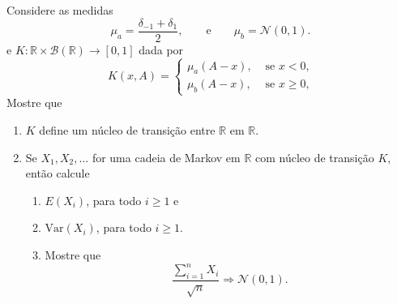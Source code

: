 \begin{exercise}
  Considere as medidas
  \begin{equation}
    \mu_a = \frac{\delta_{-1} + \delta_1}{2}, \qquad \text{e} \qquad \mu_b = \mathcal{N}(0, 1).
  \end{equation}
  e $K:\mathbb{R} \times \mathcal{B}(\mathbb{R}) \to [0,1]$ dada por
  \begin{equation}
    K(x, A) =
    \begin{cases}
      \mu_a (A - x), & \text{ se $x < 0$,}\\
      \mu_b (A - x), & \text{ se $x \geq 0$,}
    \end{cases}
  \end{equation}
  Mostre que
  \begin{enumerate}[\quad a)]
  \item $K$ define um núcleo de transição entre $\mathbb{R}$ em $\mathbb{R}$.
  \item Se $X_1, X_2, \dots$ for uma cadeia de Markov em $\mathbb{R}$ com núcleo de transição $K$, então calcule
    \begin{enumerate}[\qquad i)]
    \item $E(X_i)$, para todo $i \geq 1$ e
    \item $\text{Var}(X_i)$, para todo $i \geq 1$.
    \item Mostre que
      \begin{equation}
        \frac{\sum_{i = 1}^n X_i}{\sqrt{n}} \Rightarrow \mathcal{N}(0,1).
      \end{equation}
    \end{enumerate}
  \end{enumerate}
\end{exercise}

